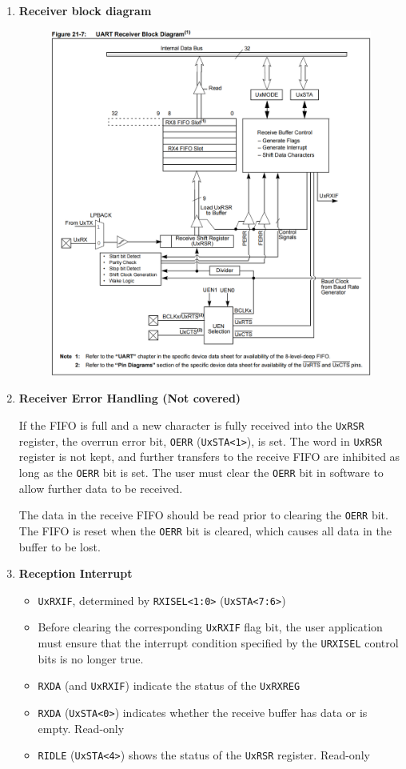 \documentclass[a4paper]{article}
\begin{document}
\begin{enumerate}[label = \arabic*.]
    \item \textbf{Receiver block diagram}
      \begin{figure}[H]
        \centering
        \includegraphics[width=0.8\linewidth]{UART_receiver_block_diagram.png}
        \label{fig:UART_receiver_block_diagram.png}
      \end{figure}

    \item \textbf{Receiver Error Handling (Not covered)}
      \par If the FIFO is full and a new character is fully received into the \verb|UxRSR| register, the overrun error bit, \verb|OERR| (\verb|UxSTA<1>|), is set. The word in \verb|UxRSR| register is not kept, and further transfers to the receive FIFO are inhibited as long as the \verb|OERR| bit is set. The user must clear the \verb|OERR| bit in software to allow further data to be received.

      \par The data in the receive FIFO should be read prior to clearing the \verb|OERR| bit. The FIFO is reset when the \verb|OERR| bit is cleared, which causes all data in the buffer to be lost.
    \item \textbf{Reception Interrupt}
      \begin{itemize}[leftmargin = 0.5cm]
        \item \verb|UxRXIF|, determined by \verb|RXISEL<1:0>| (\verb|UxSTA<7:6>|)
        \item Before clearing the corresponding \verb|UxRXIF| flag bit, the user application must ensure that the interrupt condition specified by the \verb|URXISEL| control bits is no longer true.
        \item \verb|RXDA| (and \verb|UxRXIF|) indicate the status of the \verb|UxRXREG|
        \item \verb|RXDA| (\verb|UxSTA<0>|) indicates whether the receive buffer has data or is empty. Read-only
        \item \verb|RIDLE| (\verb|UxSTA<4>|) shows the status of the \verb|UxRSR| register. Read-only
      \end{itemize}


\end{enumerate}
\end{document}
